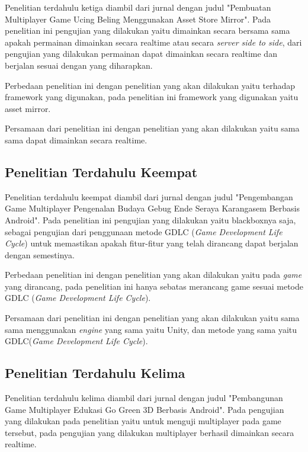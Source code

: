 \begin{sloppypar}
Penelitian terdahulu ketiga diambil dari jurnal dengan judul "Pembuatan Multiplayer Game Ucing Beling Menggunakan Asset Store Mirror". Pada penelitian ini pengujian yang dilakukan yaitu dimainkan secara bersama sama apakah permainan dimainkan secara realtime atau secara \textit{server side to side}, dari pengujian yang dilakukan permainan dapat dimainkan secara realtime dan berjalan sesuai dengan yang diharapkan.

Perbedaan penelitian ini dengan penelitian yang akan dilakukan yaitu terhadap framework yang digunakan, pada penelitian ini framework yang digunakan yaitu asset mirror.

Persamaan dari penelitian ini dengan penelitian yang akan dilakukan yaitu sama sama dapat dimainkan secara realtime.

\subsection{Penelitian Terdahulu Keempat}
\noindent

Penelitian terdahulu keempat diambil dari jurnal dengan judul "Pengembangan Game Multiplayer Pengenalan Budaya Gebug Ende Seraya Karangasem Berbasis Android". Pada penelitian ini pengujian yang dilakukan yaitu blackboxnya saja, sebagai pengujian dari penggunaan metode GDLC (\textit{Game Development Life Cycle}) untuk memastikan apakah fitur-fitur yang telah dirancang dapat berjalan dengan semestinya.

Perbedaan penelitian ini dengan penelitian yang akan dilakukan yaitu pada \textit{game} yang dirancang, pada penelitian ini hanya sebatas merancang game sesuai metode GDLC (\textit{Game Development Life Cycle}).

Persamaan dari penelitian ini dengan penelitian yang akan dilakukan yaitu sama sama menggunakan \textit{engine} yang sama yaitu Unity, dan metode yang sama yaitu GDLC(\textit{Game Development Life Cycle}).

\subsection{Penelitian Terdahulu Kelima}
\noindent

Penelitian terdahulu kelima diambil dari jurnal dengan judul "Pembangunan Game Multiplayer Edukasi Go Green 3D Berbasis Android". Pada pengujian yang dilakukan pada penelitian yaitu untuk menguji multiplayer pada game tersebut, pada pengujian yang dilakukan multiplayer berhasil dimainkan secara realtime.


\end{sloppypar}

